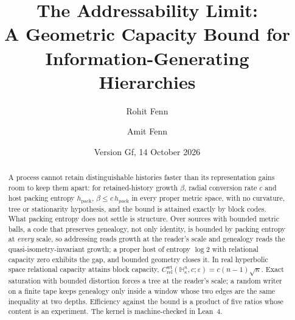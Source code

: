 \documentclass[11pt,reqno]{amsart}
\theoremstyle{plain}
\theoremstyle{definition}
\newcommand{\hpack}{h_{\mathrm{pack}}}
\newcommand{\Crel}{C_{\mathrm{rel}}}
\newcommand{\Hk}{\mathbb{H}^n_\kappa}
\newcommand{\eps}{\varepsilon}
\begin{document}
\title[The Addressability Limit]{The Addressability Limit:\\ A Geometric Capacity Bound for Information-Generating Hierarchies}

\author{Rohit Fenn}
\author{Amit Fenn}
\address{Sentry Bio, Inc., USA}

\date{Version Gf, 14 October 2026}

\begin{abstract}
A process cannot retain distinguishable histories faster than its representation gains room to keep them apart: for retained-history growth $\beta$, radial conversion rate $c$ and host packing entropy $\hpack$, $\beta\le c\,\hpack$ in every proper metric space, with no curvature, tree or stationarity hypothesis, and the bound is attained exactly by block codes. What packing entropy does not settle is structure. Over sources with bounded metric balls, a code that preserves genealogy, not only identity, is bounded by packing entropy at \emph{every} scale, so addressing reads growth at the reader's scale and genealogy reads the quasi-isometry-invariant growth; a proper host of entropy $\log2$ with relational capacity zero exhibits the gap, and bounded geometry closes it. In real hyperbolic space relational capacity attains block capacity, $\Crel^{\mathrm{wt}}(\Hk,c;\eps)=c(n-1)\sqrt\kappa$. Exact saturation with bounded distortion forces a tree at the reader's scale; a random writer on a finite tape keeps genealogy only inside a window whose two edges are the same inequality at two depths. Efficiency against the bound is a product of five ratios whose content is an experiment. The kernel is machine-checked in Lean~4.
\end{abstract}

\maketitle
\end{document}

